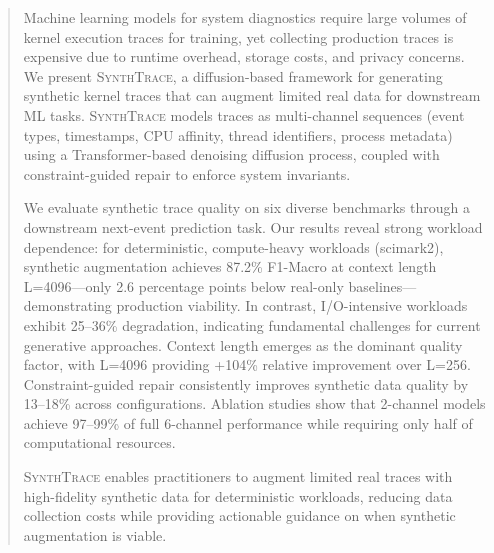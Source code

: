 \begin{abstract}
Machine learning models for system diagnostics require large volumes of kernel execution traces for training, yet collecting production traces is expensive due to runtime overhead, storage costs, and privacy concerns.
We present \textsc{SynthTrace}, a diffusion-based framework for generating synthetic kernel traces that can augment limited real data for downstream ML tasks.
\textsc{SynthTrace} models traces as multi-channel sequences (event types, timestamps, CPU affinity, thread identifiers, process metadata) using a Transformer-based denoising diffusion process, coupled with constraint-guided repair to enforce system invariants.

We evaluate synthetic trace quality on six diverse benchmarks through a downstream next-event prediction task.
Our results reveal strong workload dependence: for deterministic, compute-heavy workloads (scimark2), synthetic augmentation achieves 87.2\% F1-Macro at context length L=4096---only 2.6 percentage points below real-only baselines---demonstrating production viability.
In contrast, I/O-intensive workloads exhibit 25--36\% degradation, indicating fundamental challenges for current generative approaches.
Context length emerges as the dominant quality factor, with L=4096 providing +104\% relative improvement over L=256.
Constraint-guided repair consistently improves synthetic data quality by 13--18\% across configurations.
Ablation studies show that 2-channel models achieve 97--99\% of full 6-channel performance while requiring only half of computational resources.

\textsc{SynthTrace} enables practitioners to augment limited real traces with high-fidelity synthetic data for deterministic workloads, reducing data collection costs while providing actionable guidance on when synthetic augmentation is viable.
\end{abstract}